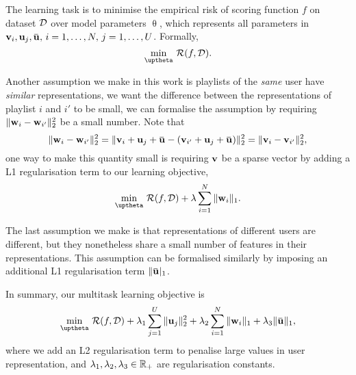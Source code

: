%
The learning task is to minimise the empirical risk of scoring function $f$ on dataset $\mathcal{D}$ over model parameters $\uptheta$,
which represents all parameters in $\bv_i, \bu_j, \widebar\bu, \, i=1,\dots,N, \, j=1,\dots,U$.
Formally,
$$
\min_{\uptheta} \, \RCal(f, \DCal).
$$

Another assumption we make in this work is playlists of the \emph{same} user have \emph{similar} representations,
\ie we want the difference between the representations of playlist $i$ and $i'$ to be small,
we can formalise the assumption by requiring $\|\mathbf{w}_i - \mathbf{w}_{i'}\|_2^2$ be a small number. 
Note that
$$
\|\w_i - \w_{i'}\|_2^2 = \|\bv_i + \bu_j + \widebar\bu - (\bv_{i'} + \bu_j + \widebar\bu) \|_2^2 = \|\bv_i - \bv_{i'}\|_2^2,
$$
one way to make this quantity small is requiring $\mathbf{v}$ be a sparse vector by adding a L1 regularisation term 
to our learning objective, \ie
$$
\min_{\uptheta} \, \RCal(f, \DCal) + \lambda \sum_{i=1}^N \|\w_i\|_1.
$$

The last assumption we make is that representations of different users are different, 
but they nonetheless share a small number of features in their representations.
This assumption can be formalised similarly by imposing an additional L1 regularisation term $\|\widebar\bu|_1$.

In summary, our multitask learning objective is
\begin{equation}
\label{eq:obj}
\min_{\uptheta} \, \RCal(f, \DCal) 
   + \lambda_1 \sum_{j=1}^U \|\bu_j\|_2^2 + \lambda_2 \sum_{i=1}^N \|\w_i\|_1 + \lambda_3 \|\widebar\bu\|_1,
\end{equation}
where we add an L2 regularisation term to penalise large values in user representation,
and $\lambda_1, \lambda_2, \lambda_3 \in \mathbb{R}_+$ are regularisation constants.
